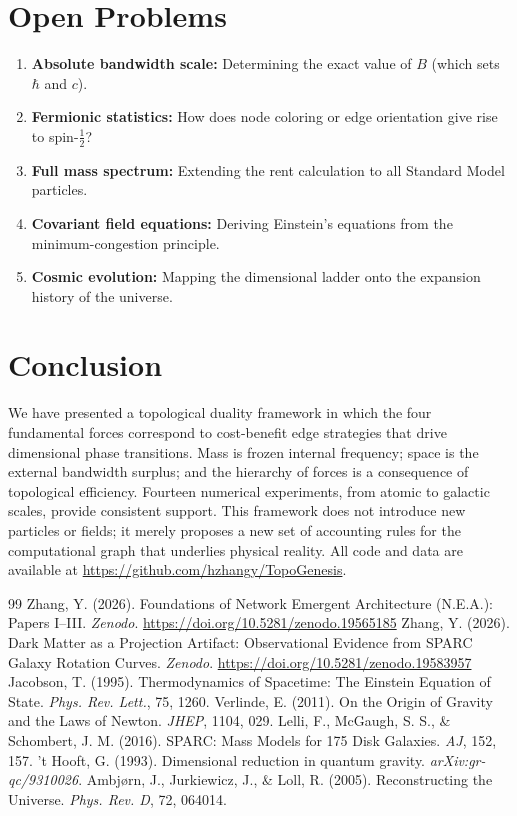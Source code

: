 \documentclass[12pt,a4paper]{article}
\begin{document}
\section{Open Problems}
\begin{enumerate}
    \item \textbf{Absolute bandwidth scale:} Determining the exact value of $B$ (which sets $\hbar$ and $c$).
    \item \textbf{Fermionic statistics:} How does node coloring or edge orientation give rise to spin-$\frac{1}{2}$?
    \item \textbf{Full mass spectrum:} Extending the rent calculation to all Standard Model particles.
    \item \textbf{Covariant field equations:} Deriving Einstein's equations from the minimum-congestion principle.
    \item \textbf{Cosmic evolution:} Mapping the dimensional ladder onto the expansion history of the universe.
\end{enumerate}

\section{Conclusion}
We have presented a topological duality framework in which the four fundamental forces correspond to cost-benefit edge strategies that drive dimensional phase transitions. Mass is frozen internal frequency; space is the external bandwidth surplus; and the hierarchy of forces is a consequence of topological efficiency. Fourteen numerical experiments, from atomic to galactic scales, provide consistent support. This framework does not introduce new particles or fields; it merely proposes a new set of accounting rules for the computational graph that underlies physical reality. All code and data are available at \url{https://github.com/hzhangy/TopoGenesis}.

\begin{thebibliography}{99}
 Zhang, Y. (2026). Foundations of Network Emergent Architecture (N.E.A.): Papers I--III. \textit{Zenodo}. \url{https://doi.org/10.5281/zenodo.19565185}
 Zhang, Y. (2026). Dark Matter as a Projection Artifact: Observational Evidence from SPARC Galaxy Rotation Curves. \textit{Zenodo}. \url{https://doi.org/10.5281/zenodo.19583957}
 Jacobson, T. (1995). Thermodynamics of Spacetime: The Einstein Equation of State. \textit{Phys. Rev. Lett.}, 75, 1260.
 Verlinde, E. (2011). On the Origin of Gravity and the Laws of Newton. \textit{JHEP}, 1104, 029.
 Lelli, F., McGaugh, S. S., \& Schombert, J. M. (2016). SPARC: Mass Models for 175 Disk Galaxies. \textit{AJ}, 152, 157.
 't Hooft, G. (1993). Dimensional reduction in quantum gravity. \textit{arXiv:gr-qc/9310026}.
 Ambj\o rn, J., Jurkiewicz, J., \& Loll, R. (2005). Reconstructing the Universe. \textit{Phys. Rev. D}, 72, 064014.
\end{thebibliography}
\end{document}

